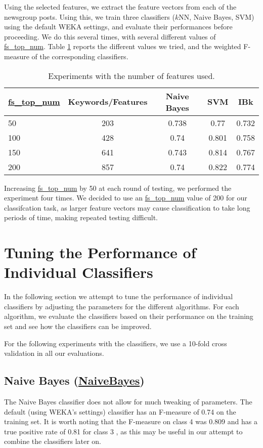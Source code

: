 \documentclass[12pt]{article}
\begin{document}
Using the selected features, we extract the feature vectors from each of the newsgroup posts. Using this, we train three classifiers ($k$NN, Naive Bayes, SVM) using the default WEKA settings, and evaluate their performances before proceeding. We do this several times, with several different values of \url{fs_top_num}. Table \ref{table:fs} reports the different values we tried, and the weighted F-measure of the corresponding classifiers.
\begin{table}[h]
\linespread{1}
\label{table:fs}
\centering
\begin{tabular}{|l|c| c c c |}
\hline 
	\url{fs_top_num} & Keywords/Features   & \textbf{Naive Bayes}& \textbf{SVM} & \textbf{IBk} \\
\hline
	50	& 203	& 0.738 & 0.77 	& 0.732 \\
	100	& 428   & 0.74	& 0.801	& 0.758	\\
	150 & 641	& 0.743 & 0.814 & 0.767 \\
	200 & 857	& 0.74	& 0.822 & 0.774 \\
\hline
\end{tabular}
\caption{Experiments with the number of features used.}
\end{table}

Increasing \url{fs_top_num} by 50 at each round of testing, we performed the experiment four times. We decided to use an \url{fs_top_num} value of 200 for our classifcation task, as larger feature vectors may cause classification to take long periods of time, making repeated testing difficult. 	
	
	



\section{Tuning the Performance of Individual Classifiers}
In the following section we attempt to tune the performance of individual classifiers by adjusting the parameters for the different algorithms. For each algorithm, we evaluate the classifiers based on their performance on the training set and see how the classifiers can be improved.

For the following experiments with the classifiers, we use a 10-fold cross validation in all our evaluations.
\subsection{Naive Bayes (\url{NaiveBayes})}
The Naive Bayes classifier does not allow for much tweaking of parameters. The default (using WEKA's settings) classifier has an  F-measure of 0.74 on the training set. It is worth noting that the F-measure on class 4 was 0.809 and has a true positive rate of 0.81 for class 3 , as this may be useful in our attempt to combine the classifiers later on.
\end{document}
